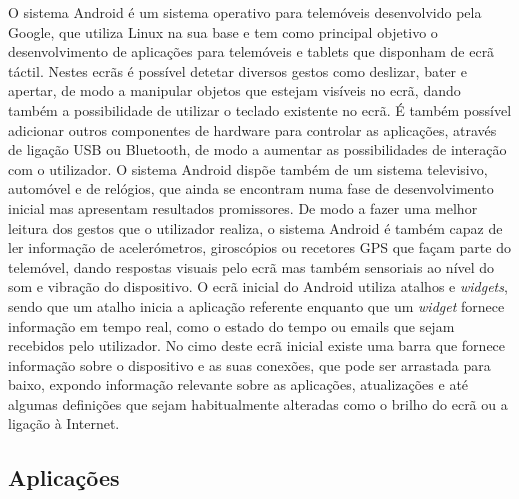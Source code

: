 O sistema Android é um sistema operativo para telemóveis desenvolvido pela Google, que utiliza Linux na sua base e tem como principal objetivo o desenvolvimento de aplicações para telemóveis e tablets que disponham de ecrã táctil.
Nestes ecrãs é possível detetar diversos gestos como deslizar, bater e apertar, de modo a manipular objetos que estejam visíveis no ecrã, dando também a possibilidade de utilizar o teclado existente no ecrã.
É também possível adicionar outros componentes de hardware para controlar as aplicações, através de ligação USB ou Bluetooth, de modo a aumentar as possibilidades de interação com o utilizador.
O sistema Android dispõe também de um sistema televisivo, automóvel e de relógios, que ainda se encontram numa fase de desenvolvimento inicial mas apresentam resultados promissores.
De modo a fazer uma melhor leitura dos gestos que o utilizador realiza, o sistema Android é também capaz de ler informação de acelerómetros, giroscópios ou recetores GPS que façam parte do telemóvel, dando respostas visuais pelo ecrã mas também sensoriais ao nível do som e vibração do dispositivo.
O ecrã inicial do Android utiliza atalhos e \emph{widgets}, sendo que um atalho inicia a aplicação referente enquanto que um \emph{widget} fornece informação em tempo real, como o estado do tempo ou emails que sejam recebidos pelo utilizador.
No cimo deste ecrã inicial existe uma barra que fornece informação sobre o dispositivo e as suas conexões, que pode ser arrastada para baixo, expondo informação relevante sobre as aplicações, atualizações e até algumas definições que sejam habitualmente alteradas como o brilho do ecrã ou a ligação à Internet.

\subsection{Aplicações}
\label{sub:aplicacoes}

